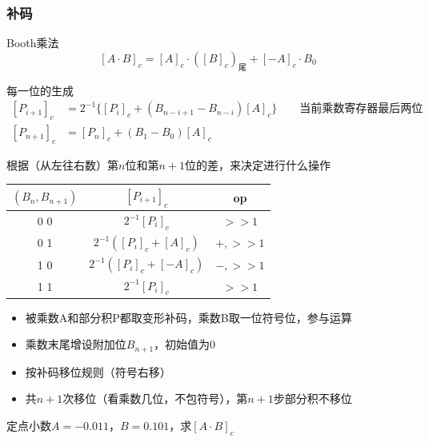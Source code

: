 \subsubsection{补码}
Booth乘法
\[[A\cdot B]_c=[A]_c\cdot([B]_c)_{\text{尾}}+[-A]_c\cdot B_0\]
\par 每一位的生成
\[\begin{aligned}
[P_{i+1}]_c&=2^{-1}\{[P_i]_c+(B_{n-i+1}-B_{n-i})[A]_c\}\qquad\mbox{当前乘数寄存器最后两位}\\
[P_{n+1}]_c&=[P_n]_c+(B_1-B_0)[A]_c
\end{aligned}\]
\par 根据（从左往右数）第$n$位和第$n+1$位的差，来决定进行什么操作
\begin{center}
\begin{tabular}{|c|c|c|}\hline
$(B_n,B_{n+1})$ & $[P_{i+1}]_c$ & op \\\hline
0 0 & $2^{-1}[P_i]_c$ & $>> 1$ \\\hline
0 1 & $2^{-1}([P_i]_c+[A]_c)$ & $+,>> 1$ \\\hline
1 0 & $2^{-1}([P_i]_c+[-A]_c)$ & $-,>> 1$ \\\hline
1 1 & $2^{-1}[P_i]_c$ & $>> 1$ \\\hline
\end{tabular}
\end{center}
\begin{itemize}
	\item 被乘数A和部分积P都取变形补码，乘数B取一位符号位，参与运算
	\item 乘数末尾增设附加位$B_{n+1}$，初始值为0
	\item 按补码移位规则（符号右移）
	\item 共$n+1$次移位（看乘数几位，不包符号），第$n+1$步部分积不移位
\end{itemize}
\begin{example}
定点小数$A=-0.011$，$B=0.101$，求$[A\cdot B]_c$
\end{example}
